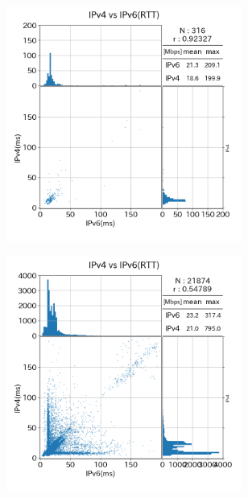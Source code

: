 \begin{figure}
\begin{center}
\begin{minipage}[t]{0.48\textwidth}
\begin{subfigure}[b]{\textwidth}
                \label{old_mix_rtt}
            \end{subfigure}
            \begin{subfigure}[b]{\textwidth}
                \centering
                \includegraphics[width=0.85\textwidth]{fig/old_PPPoE_rtt.png}
                \label{old_PPPoE_rtt}
            \end{subfigure}
            \caption{(1)のRTT}
            \label{fig:old_connect_rtt}
        \end{minipage}
        \hfill
        \begin{minipage}[t]{0.48\textwidth}
            \begin{subfigure}[b]{\textwidth}
                \centering
                \includegraphics[width=0.85\textwidth]{fig/new_IPv4aaS_rtt.png}

\end{subfigure}
\end{minipage}
\end{center}
\end{figure}
